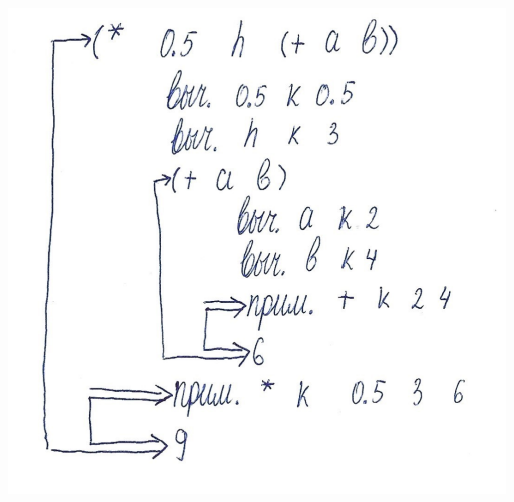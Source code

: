 \documentclass[12pt]{report}
\begin{document}
\includegraphics[scale=1.2]{img/d2}

	
	
	
\end{document}
